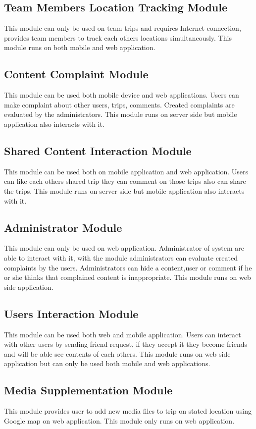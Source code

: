 \subsection{Team Members Location Tracking Module}
This module can only be used on team trips and requires Internet connection, provides team members to track each others locations simultaneously. This module runs on both mobile  and web application.
   
\subsection{Content Complaint Module}   
This module can be used both mobile device and web applications. Users can make complaint about other users, trips, comments. Created complaints are evaluated by the administrators. This module runs on server side but mobile application also interacts with it.
    
\subsection{Shared Content Interaction Module}    
This module can be used both on mobile application and web application. Users can like each others shared trip they can comment on those trips also can share the trips. This module runs on server side but mobile application also interacts with it.

\subsection{Administrator Module}
This module can only be used on web application. Administrator of system are able to interact with it, with the module administrators can evaluate created complaints by the users. Administrators can hide a content,user or comment if he or she thinks that complained content is inappropriate. This module runs on web side application.

\subsection{Users Interaction Module}
This module can be used both web and mobile application. Users can interact with other users by sending friend request, if they accept it they become friends and will be able see contents of each others. This module runs on web side application but can only be used both mobile and web applications.

\subsection{Media Supplementation Module}
This module provides user to add new media files to trip on stated location using Google map on web application. This module only runs on web application.


